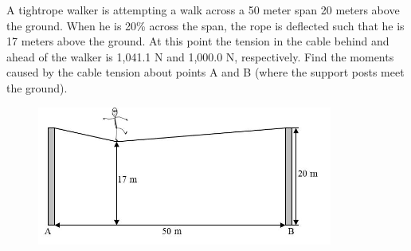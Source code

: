 

\noindent A tightrope walker is attempting a walk across a 50 meter span 20 meters above the ground. When
he is 20\% across the span, the rope is deflected such that he is 17 meters above the ground. 
At this point the tension in the cable behind and ahead of the walker is 1,041.1 N and 1,000.0 N, respectively.
\newline
\noindent Find the moments caused by the cable tension about points A and B (where the support posts meet the ground).


\begin{figure}[ht!]
  \centering
  \includegraphics[height=1.8in]{fig.png}
\end{figure}

